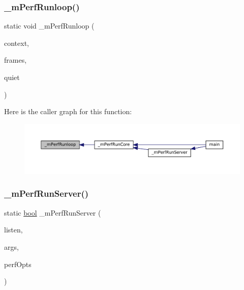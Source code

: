 \subsubsection{\texorpdfstring{\+\_\+m\+Perf\+Runloop()}{\_mPerfRunloop()}}
{\footnotesize\ttfamily static void \+\_\+m\+Perf\+Runloop (\begin{DoxyParamCaption}\item[{struct m\+Core $\ast$}]{context,  }\item[{\mbox{\hyperlink{ioapi_8h_a787fa3cf048117ba7123753c1e74fcd6}{int}} $\ast$}]{frames,  }\item[{\mbox{\hyperlink{libretro_8h_a4a26dcae73fb7e1528214a068aca317e}{bool}}}]{quiet }\end{DoxyParamCaption})\hspace{0.3cm}{\ttfamily [static]}}

Here is the caller graph for this function\+:
\nopagebreak
\begin{figure}[H]
\begin{center}
\leavevmode
\includegraphics[width=350pt]{perf-main_8c_af6104bb4f19919428b0781d4c2e09e1d_icgraph}
\end{center}
\end{figure}
\mbox{\label{perf-main_8c_afabe448ade5b82039d7a47c954faff33}} 
\subsubsection{\texorpdfstring{\+\_\+m\+Perf\+Run\+Server()}{\_mPerfRunServer()}}
{\footnotesize\ttfamily static \mbox{\hyperlink{libretro_8h_a4a26dcae73fb7e1528214a068aca317e}{bool}} \+\_\+m\+Perf\+Run\+Server (\begin{DoxyParamCaption}\item[{const char $\ast$}]{listen,  }\item[{const struct m\+Arguments $\ast$}]{args,  }\item[{const struct Perf\+Opts $\ast$}]{perf\+Opts }\end{DoxyParamCaption})\hspace{0.3cm}{\ttfamily [static]}}

